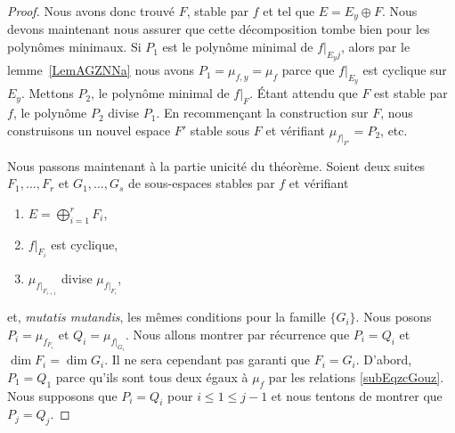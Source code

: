 \begin{proof}
    Nous avons donc trouvé \( F\), stable par \( f\) et tel que \( E=E_y\oplus F\). Nous devons maintenant nous assurer que cette décomposition tombe bien pour les polynômes minimaux. Si \( P_1\) est le polynôme minimal de \( f|_{E_yj}\), alors par le lemme~\ref{LemAGZNNa} nous avons \( P_1=\mu_{f,y}=\mu_f\) parce que \( f|_{E_y}\) est cyclique sur \( E_y\). Mettons \( P_2\), le polynôme minimal de \( f|_F\). Étant attendu que \( F\) est stable par \( f\), le polynôme \( P_2\) divise \( P_1\). En recommençant la construction sur \( F\), nous construisons un nouvel espace \( F'\) stable sous \( F\) et vérifiant \( \mu_{f|_{F'}}=P_2\), etc.

    Nous passons maintenant à la partie unicité du théorème. Soient deux suites \( F_1,\ldots, F_r\) et \( G_1,\ldots, G_s\) de sous-espaces stables par \( f\) et vérifiant
    \begin{enumerate}
        \item
            \( E=\bigoplus_{i=1}^rF_i\),
        \item
            \( f|_{F_i}\) est cyclique,
        \item
            \( \mu_{f|_{F_{i+1}}}\) divise \( \mu_{f|_{F_i}}\),
    \end{enumerate}
    et, \emph{mutatis mutandis}, les mêmes conditions pour la famille \( \{ G_i \}\). Nous posons \( P_i=\mu_{f_{F_i}}\) et \( Q_i=\mu_{f|_{G_i}}\). Nous allons montrer par récurrence que \( P_i=Q_i\) et \( \dim F_i=\dim G_i\). Il ne sera cependant pas garanti que \( F_i=G_i\). D'abord, \( P_1=Q_1\) parce qu'ils sont tous deux égaux à \( \mu_f\) par les relations \eqref{subEqzcGouz}. Nous supposons que \( P_i=Q_i\) pour \( i\leq 1\leq j-1\) et nous tentons de montrer que \( P_j=Q_j\).


\end{proof}

